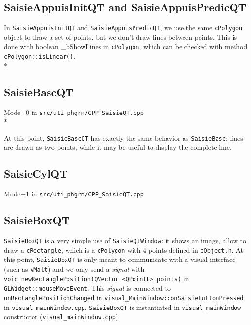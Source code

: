\documentclass[a4paper]{book}
\begin{document}
\subsection{SaisieAppuisInitQT and SaisieAppuisPredicQT}

In {\tt SaisieAppuisInitQT} and {\tt SaisieAppuisPredicQT}, we use the same {\tt cPolygon} object to draw a set of points, but we don't draw lines between points. This is done with boolean \_bShowLines in {\tt cPolygon}, which can be checked with method {\tt cPolygon::isLinear()}.\\*

\subsection{SaisieBascQT}
Mode=0 in {\tt src/uti\_phgrm/CPP\_SaisieQT.cpp} \\*

At this point, {\tt SaisieBascQT} has exactly the same behavior as {\tt SaisieBasc}: lines are drawn as two points, while it may be useful to display the complete line.

\subsection{SaisieCylQT}
Mode=1 in {\tt src/uti\_phgrm/CPP\_SaisieQT.cpp} 
\subsection{SaisieBoxQT}

{\tt SaisieBoxQT} is a very simple use of {\tt SaisieQtWindow}: it shows an image, allow to draw a {\tt cRectangle}, which is a {\tt cPolygon} with 4 points defined in {\tt cObject.h}. At this point, {\tt SaisieBoxQT} is only meant to communicate with a visual interface (such as {\tt vMalt}) and we only send a \textit{signal} with\\ {\tt void newRectanglePosition(QVector <QPointF> points)} in {\tt GLWidget::mouseMoveEvent}. This \textit{signal} is connected to {\tt onRectanglePositionChanged} in {\tt visual\_MainWindow::onSaisieButtonPressed} in {\tt visual\_mainWindow.cpp}.
{\tt SaisieBoxQT} is instantiated in {\tt visual\_mainWindow} constructor ({\tt visual\_mainWindow.cpp}).
\end{document}
